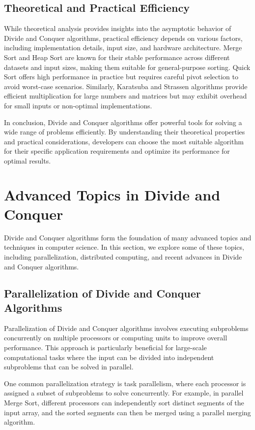 \documentclass[12pt]{book} %
\begin{document}
\subsection{Theoretical and Practical Efficiency}

While theoretical analysis provides insights into the asymptotic behavior of Divide and Conquer algorithms, practical efficiency depends on various factors, including implementation details, input size, and hardware architecture. Merge Sort and Heap Sort are known for their stable performance across different datasets and input sizes, making them suitable for general-purpose sorting. Quick Sort offers high performance in practice but requires careful pivot selection to avoid worst-case scenarios. Similarly, Karatsuba and Strassen algorithms provide efficient multiplication for large numbers and matrices but may exhibit overhead for small inputs or non-optimal implementations.

In conclusion, Divide and Conquer algorithms offer powerful tools for solving a wide range of problems efficiently. By understanding their theoretical properties and practical considerations, developers can choose the most suitable algorithm for their specific application requirements and optimize its performance for optimal results.

\section{Advanced Topics in Divide and Conquer}

Divide and Conquer algorithms form the foundation of many advanced topics and techniques in computer science. In this section, we explore some of these topics, including parallelization, distributed computing, and recent advances in Divide and Conquer algorithms.

\subsection{Parallelization of Divide and Conquer Algorithms}

Parallelization of Divide and Conquer algorithms involves executing subproblems concurrently on multiple processors or computing units to improve overall performance. This approach is particularly beneficial for large-scale computational tasks where the input can be divided into independent subproblems that can be solved in parallel.

One common parallelization strategy is task parallelism, where each processor is assigned a subset of subproblems to solve concurrently. For example, in parallel Merge Sort, different processors can independently sort distinct segments of the input array, and the sorted segments can then be merged using a parallel merging algorithm.
\end{document}
